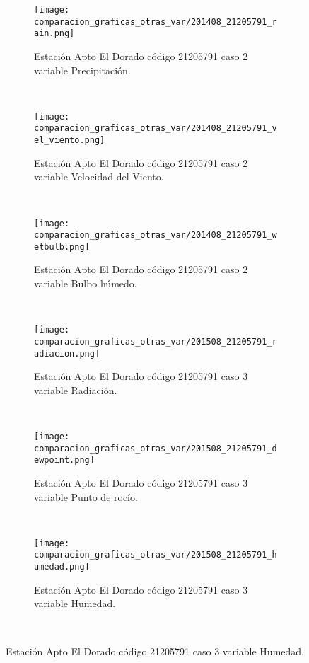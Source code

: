 \begin{figure}[H]
\centering
\begin{subfigure}[normla]{0.4\textwidth}
\caption{Estación Apto El Dorado código 21205791 caso 2 variable Precipitación.}
\texttt{[image: comparacion\_graficas\_otras\_var/201408\_21205791\_rain.png]}
\end{subfigure}
~
\begin{subfigure}[normla]{0.4\textwidth}
\caption{Estación Apto El Dorado código 21205791 caso 2 variable Velocidad del Viento.}
\texttt{[image: comparacion\_graficas\_otras\_var/201408\_21205791\_vel\_viento.png]}
\end{subfigure}
~
\begin{subfigure}[normla]{0.4\textwidth}
\caption{Estación Apto El Dorado código 21205791 caso 2 variable Bulbo húmedo.}
\texttt{[image: comparacion\_graficas\_otras\_var/201408\_21205791\_wetbulb.png]}
\end{subfigure}
~
\begin{subfigure}[normla]{0.4\textwidth}
\caption{Estación Apto El Dorado código 21205791 caso 3 variable Radiación.}
\texttt{[image: comparacion\_graficas\_otras\_var/201508\_21205791\_radiacion.png]}
\end{subfigure}
~
\begin{subfigure}[normla]{0.4\textwidth}
\caption{Estación Apto El Dorado código 21205791 caso 3 variable Punto de rocío.}
\texttt{[image: comparacion\_graficas\_otras\_var/201508\_21205791\_dewpoint.png]}
\end{subfigure}
~
\begin{subfigure}[normla]{0.4\textwidth}
\caption{Estación Apto El Dorado código 21205791 caso 3 variable Humedad.}
\texttt{[image: comparacion\_graficas\_otras\_var/201508\_21205791\_humedad.png]}
\end{subfigure}
~
\end{figure}
           
